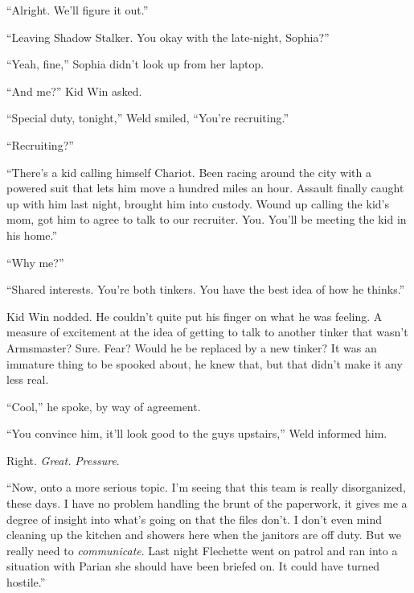 ``Alright.  We'll figure it out.''



``Leaving Shadow Stalker.  You okay with the late-night, Sophia?''



``Yeah, fine,'' Sophia didn't look up from her laptop.



``And me?'' Kid Win asked.



``Special duty, tonight,'' Weld smiled, ``You're recruiting.''



``Recruiting?''



``There's a kid calling himself Chariot.  Been racing around the city with a powered suit that lets him move a hundred miles an hour.  Assault finally caught up with him last night, brought him into custody.  Wound up calling the kid's mom, got him to agree to talk to our recruiter.  You.  You'll be meeting the kid in his home.''



``Why me?''



``Shared interests.  You're both tinkers.  You have the best idea of how he thinks.''



Kid Win nodded.  He couldn't quite put his finger on what he was feeling.  A measure of excitement at the idea of getting to talk to another tinker that wasn't Armsmaster?  Sure.  Fear?  Would he be replaced by a new tinker?  It was an immature thing to be spooked about, he knew that, but that didn't make it any less real.



``Cool,'' he spoke, by way of agreement.



``You convince him, it'll look good to the guys upstairs,'' Weld informed him.



Right.  \emph{Great.  }\emph{Pressure}.



``Now, onto a more serious topic.  I'm seeing that this team is really disorganized, these days.  I have no problem handling the brunt of the paperwork, it gives me a degree of insight into what's going on that the files don't.  I don't even mind cleaning up the kitchen and showers here when the janitors are off duty.  But we really need to \emph{communicate}.  Last night Flechette went on patrol and ran into a situation with Parian she should have been briefed on.  It could have turned hostile.''



